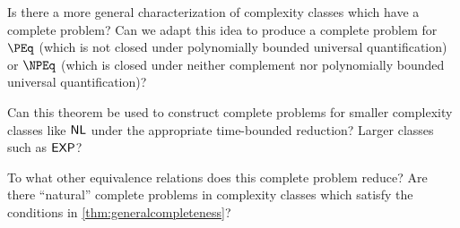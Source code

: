 \begin{openproblem}
  Is there a more general characterization of complexity classes which have a complete problem?
  Can we adapt this idea to produce a complete problem for $\PEq$ (which is not closed under polynomially bounded universal quantification) or $\NPEq$ (which is closed under neither complement nor polynomially bounded universal quantification)?
\end{openproblem}

\begin{openproblem}
  Can this theorem be used to construct complete problems for smaller complexity classes like ${\mathsf{NL}}$ under the appropriate time-bounded reduction?
  Larger classes such as ${\mathsf{EXP}}$?
\end{openproblem}

\begin{openproblem}
  To what other equivalence relations does this complete problem reduce?
  Are there ``natural'' complete problems in complexity classes which satisfy the conditions in \autoref{thm:generalcompleteness}?
\end{openproblem}
